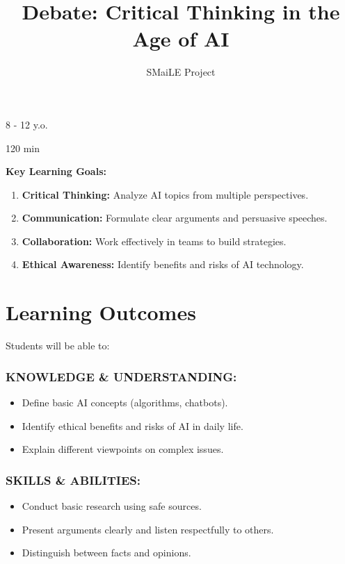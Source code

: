 \documentclass[11pt, a4paper]{article}
\begin{document}
\title{\textbf{\color{SmailePurple}Debate: Critical Thinking in the Age of AI}}
\author{SMaiLE Project}
\date{}
\maketitle
\thispagestyle{plain}

\begin{keyinfobox}
    \begin{description}[leftmargin=*, labelindent=0pt]
        \item[\bfseries\color{SmailePurple} Target Group:] 8 - 12 y.o.
        \item[\bfseries\color{SmailePurple} Duration:] 120 min
    \end{description}
    \textbf{Key Learning Goals:}
    \begin{enumerate}
        \item \textbf{Critical Thinking:} Analyze AI topics from multiple perspectives.
        \item \textbf{Communication:} Formulate clear arguments and persuasive speeches.
        \item \textbf{Collaboration:} Work effectively in teams to build strategies.
        \item \textbf{Ethical Awareness:} Identify benefits and risks of AI technology.
    \end{enumerate}
\end{keyinfobox}

\section*{Learning Outcomes}
Students will be able to:

\subsubsection*{KNOWLEDGE \& UNDERSTANDING:}
\begin{itemize}
    \item Define basic AI concepts (algorithms, chatbots).
    \item Identify ethical benefits and risks of AI in daily life.
    \item Explain different viewpoints on complex issues.
\end{itemize}

\subsubsection*{SKILLS \& ABILITIES:}
\begin{itemize}
    \item Conduct basic research using safe sources.
    \item Present arguments clearly and listen respectfully to others.
    \item Distinguish between facts and opinions.
\end{itemize}
\end{document}
